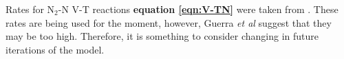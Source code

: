 \documentclass[11pt, oneside]{article}   	%
\begin{document}
Rates for N$_2$-N V-T reactions \textbf{equation \ref{eqn:V-TN}} were taken from \cite{Guerra1995non}.
These rates are being used for the moment, however, Guerra \textit{et al} \cite{Guerra2004kinetic} suggest that they may be too high.
Therefore, it is something to consider changing in future iterations of the model.

%



%
\end{document}
